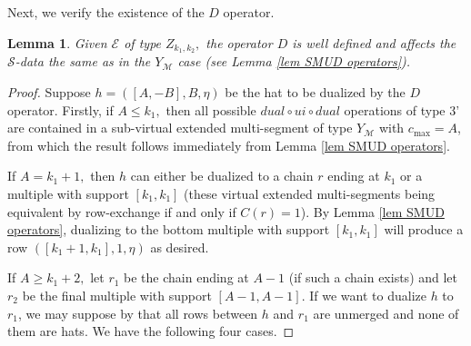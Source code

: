 \documentclass[11pt,letterpaper]{amsart}
\newtheorem{lemma}[thm]{Lemma}
\numberwithin{equation}{section}
\begin{document}
Next, we verify the existence of the $D$ operator.

\begin{lemma}
\label{D existence Z}
    Given $\mathcal{E}$ of type $Z_{k_1, k_2},$ the operator $D$ is well defined and affects the $\mathcal{S}$-data the same as in the $Y_\mathcal{M}$ case (see Lemma \ref{lem SMUD operators}).
\end{lemma}

\begin{proof}
    Suppose $h = ([A, -B], B, \eta)$ be the hat to be dualized by the $D$ operator. Firstly, if $A \leq k_1,$ then all possible $dual \circ ui \circ dual$ operations of type 3' are contained in a sub-virtual extended multi-segment of type $Y_\mathcal{M}$ with $c_{\max} = A$, from which the result follows immediately from Lemma \ref{lem SMUD operators}.
    
    If $A = k_1 + 1,$ then $h$ can either be dualized to a chain $r$ ending at $k_1$ or a multiple with support $[k_1, k_1]$ (these virtual extended multi-segments being equivalent by row-exchange if and only if $C(r) = 1$). By Lemma \ref{lem SMUD operators}, dualizing to the bottom multiple with support $[k_1, k_1]$ will produce a row $([k_1 + 1, k_1], 1, \eta)$ as desired.

    If $A \geq k_1 + 2,$ let $r_1$ be the chain ending at $A - 1$ (if such a chain exists) and let $r_2$ be the final multiple with support $[A - 1, A - 1].$ If we want to dualize $h$ to $r_1$, we may suppose by \cite[Corollary 5.32 and Lemma 6.8]{HKT26} that all rows between $h$ and $r_1$ are unmerged and none of them are hats. We have the following four cases.


\end{proof}
\end{document}
